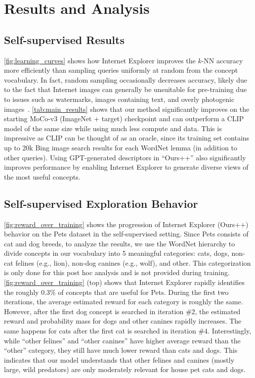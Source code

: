 \section{Results and Analysis}
\subsection{Self-supervised Results}
\cref{fig:learning_curves} shows how Internet Explorer improves the $k$-NN accuracy more efficiently than sampling queries uniformly at random from the concept vocabulary. In fact, random sampling occasionally decreases accuracy, likely due to the fact that Internet images can generally be unsuitable for pre-training due to issues such as watermarks, images containing text, and overly photogenic images~\cite{mezuman2012learning,chen2015webly}. \cref{tab:main_results} shows that our method significantly improves on the starting MoCo-v3 (ImageNet + target) checkpoint and can outperform a CLIP~\cite{radford2021learning} model of the same size while using much less compute and data. This is impressive as CLIP can be thought of as an oracle, since its training set contains up to 20k Bing image search results for each WordNet lemma (in addition to other queries).
Using GPT-generated descriptors in ``Ours++'' also significantly improves performance by enabling Internet Explorer to generate diverse views of the most useful concepts. 

\subsection{Self-supervised Exploration Behavior}
\label{sec:exploration_behavior}
\cref{fig:reward_over_training} shows the progression of Internet Explorer (Ours++) behavior on the Pets dataset in the self-supervised setting. Since Pets consists of cat and dog breeds, to analyze the results, we use the WordNet hierarchy to divide concepts in our vocabulary into 5 meaningful categories: cats, dogs, non-cat felines (e.g., lion), non-dog canines (e.g., wolf), and other. This categorization is only done for this post hoc analysis and is not provided during training. \cref{fig:reward_over_training} (top) shows that
Internet Explorer rapidly identifies the roughly $0.3\%$ of concepts that are useful for Pets. During the first two iterations, the average estimated reward for each category is roughly the same. However, after the first dog concept is searched in iteration $\#2$, the estimated reward and probability mass for dogs and other canines rapidly increases. The same happens for cats after the first cat is searched in iteration $\#4$. Interestingly, while ``other felines'' and ``other canines''  have higher average reward than the ``other'' category, they still have much lower reward than cats and dogs. This indicates that our model understands that other felines and canines (mostly large, wild predators) are only moderately relevant for house pet cats and dogs. 

